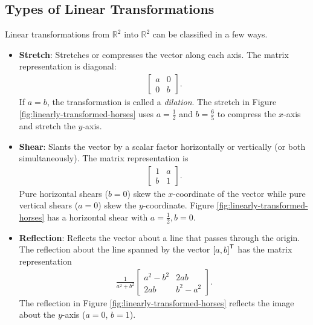 \subsection*{Types of Linear Transformations} %

Linear transformations from $\mathbb{R}^2$ into $\mathbb{R}^2$ can be classified in a few ways.

\begin{itemize}

\item \textbf{Stretch}: %
Stretches or compresses the vector along each axis.
The matrix representation is diagonal:
%
\begin{align*}
\left[\begin{array}{rr}
a & 0  \\
0 & b
\end{array}\right].
\end{align*}
%
If $a=b$, the transformation is called a \emph{dilation}.
The stretch in Figure \ref{fig:linearly-transformed-horses} uses $a = \frac{1}{2}$ and $b = \frac{6}{5}$ to compress the $x$-axis and stretch the $y$-axis.

\item \textbf{Shear}: %
Slants the vector by a scalar factor horizontally or vertically (or both simultaneously).
The matrix representation is
%
\begin{align*}
\left[\begin{array}{cc}
1 & a\\
b & 1
\end{array}\right].
\end{align*}
%
Pure horizontal shears ($b = 0$) skew the $x$-coordinate of the vector while pure vertical shears ($a = 0$) skew the $y$-coordinate.
Figure \ref{fig:linearly-transformed-horses} has a horizontal shear with $a=\frac{1}{2},b=0$.

\item \textbf{Reflection}: Reflects the vector about a line that passes through the origin.
The reflection about the line spanned by the vector $\left[a, b\right]^{\mathsf T}$ has the matrix representation
%
\begin{align*}
\frac{1}{a^2 + b^2}
\left[\begin{array}{cc}
a^2 - b^2 & 2ab \\
2ab       & b^2 - a^2
\end{array}\right].
\end{align*}
%
The reflection in Figure \ref{fig:linearly-transformed-horses} reflects the image about the $y$-axis ($a=0$, $b=1$).


\end{itemize}
